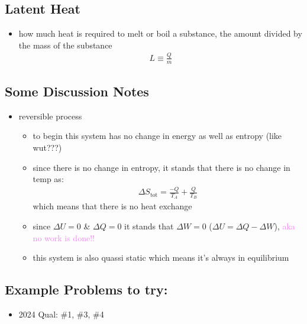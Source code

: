 \subsection{Latent Heat}
\begin{itemize}
	\item how much heat is required to melt or boil a substance, the amount divided by the mass of the substance
	      \begin{align}
		      L \equiv \frac{Q}{m}
	      \end{align}
\end{itemize}

\subsection{Some Discussion Notes}
\begin{itemize}
	\item reversible process
	      \begin{itemize}
		      \item to begin this system has no change in energy as well as entropy (like wut???)
		      \item since there is no change in entropy, it stands that there is no change in temp as:
		            \begin{align}
			            \Delta S_\text{tot} = \frac{-Q}{T_A} + \frac{Q}{T_B}
		            \end{align}
		            which means that there is no heat exchange
		      \item since $\Delta U = 0$ \& $\Delta Q = 0$ it stands that $\Delta W = 0$
		            ($\Delta U = \Delta Q - \Delta W$), \textcolor{violet}{aka no work is done!!}
		      \item this system is also quassi static which means it's always in equilibrium
	      \end{itemize}
\end{itemize}


\subsection{Example Problems to try:}
\begin{itemize}
	\item 2024 Qual: \#1, \#3, \#4
\end{itemize}
